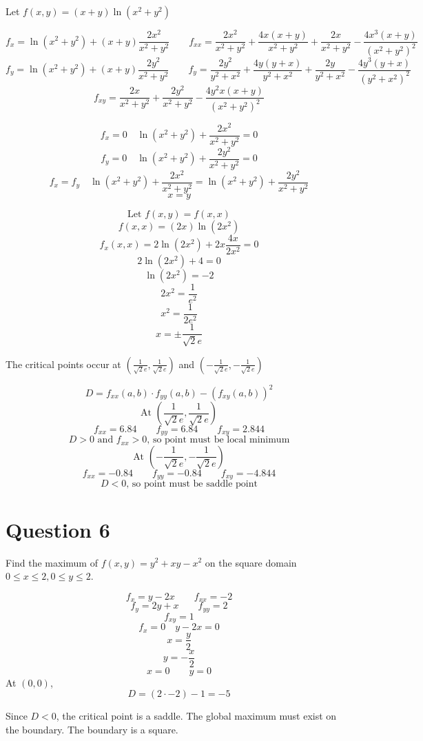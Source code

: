 \documentclass[hidelinks]{article}
\begin{document}
Let $f(x, y)  = (x + y)\ln(x^2+y^2)$ 

\[
	f_x = \ln(x^2+y^2)+ (x+y)\frac{2x^2}{x^2+y^2} \quad \quad f_{xx} = \frac{2x^{2}}{x^{2} + y^{2}} + \frac{4x \left(x + y\right)}{x^{2} + y^{2}} + \frac{2x}{x^{2} + y^{2}} - \frac{4x^{3} \left(x + y\right)}{\left(x^{2} + y^{2}\right)^{2}}
\]
\[
	f_y = \ln(x^2+y^2)+ (x+y)\frac{2y^2}{x^2+y^2} \quad \quad f_{y} = \frac{2y^{2}}{y^{2} + x^{2}} + \frac{4y \left(y + x\right)}{y^{2} + x^{2}} + \frac{2y}{y^{2} + x^{2}} - \frac{4y^{3} \left(y + x\right)}{\left(y^{2} + x^{2}\right)^{2}}
\]
\[
	f_{xy} = \frac{2x}{x^{2} + y^{2}} + \frac{2y^{2}}{x^{2} + y^{2}} - \frac{4y^{2} x \left(x + y\right)}{\left(x^{2} + y^{2}\right)^{2}}
\]

\[
	f_x = 0 \quad \ln(x^2+y^2)+ \frac{2x^2}{x^2+y^2} = 0
\]
\[
	f_y = 0 \quad \ln(x^2+y^2)+ \frac{2y^2}{x^2+y^2} = 0
\]
\[
	f_x = f_y \quad \ln(x^2+y^2)+ \frac{2x^2}{x^2+y^2} = \ln(x^2+y^2)+ \frac{2y^2}{x^2+y^2} 
\]
\[
	x = y
\]

\[
	\text{Let }f(x, y) = f(x, x)
\]
\[
	f(x, x) = (2x)\ln(2x^2)
\]
\[
	f_x(x, x) = 2\ln(2x^2) + 2x\frac{4x}{2x^2} = 0
\]
\[
	2\ln(2x^2) + 4 = 0
\]
\[
	\ln(2x^2) = -2
\]
\[
	2x^2 = \frac{1}{e^2}
\]
\[
	x^2 = \frac{1}{2e^2}
\]
\[
	x = \pm \frac{1}{\sqrt{2}e}
\]

The critical points occur at $(\frac{1}{\sqrt{2}e}, \frac{1}{\sqrt{2}e})$ and $(-\frac{1}{\sqrt{2}e}, -\frac{1}{\sqrt{2}e})$

\[
	D = f_{xx}(a, b) \cdot f_{yy}(a, b) - (f_{xy}(a, b))^2
\]
\[
	\text{At } (\frac{1}{\sqrt{2}e}, \frac{1}{\sqrt{2}e}) 
\]
\[
	f_{xx} = 6.84 \quad \quad f_{yy} = 6.84 \quad \quad f_{xy} = 2.844 
\]
\[
	D > 0 \text{ and } f_{xx} > 0 \text{, so point must be local minimum}
\]
\[
	\text{At } (-\frac{1}{\sqrt{2}e}, -\frac{1}{\sqrt{2}e}) 
\]
\[
	f_{xx} = -0.84 \quad \quad f_{yy} = -0.84 \quad \quad f_{xy} = -4.844 
\]
\[
	D < 0 \text{, so point must be saddle point}
\]
\newpage
\section{Question 6}
Find the maximum of $f(x, y) = y^2+xy-x^2$ on the square domain $0 \leq x \leq 2,
0 \leq y \leq 2$.

\[
	f_x = y - 2x \quad \quad f_{xx} = -2
\]
\[
	f_y = 2y + x \quad \quad f_{yy} = 2
\]
\[
	f_{xy} = 1
\]
\[
	f_x = 0 \quad y-2x = 0
\]
\[
	x = \frac{y}{2}
\]
\[
	y = - \frac{x}{2}
\]
\[
	x = 0 \quad \quad y = 0 
\]
At $(0, 0)$, 
\[
	D = (2 \cdot -2) -1  = -5
\]

Since $D < 0 $, the critical point is a saddle. The global maximum must exist on the boundary. The boundary is a square.
\end{document}
